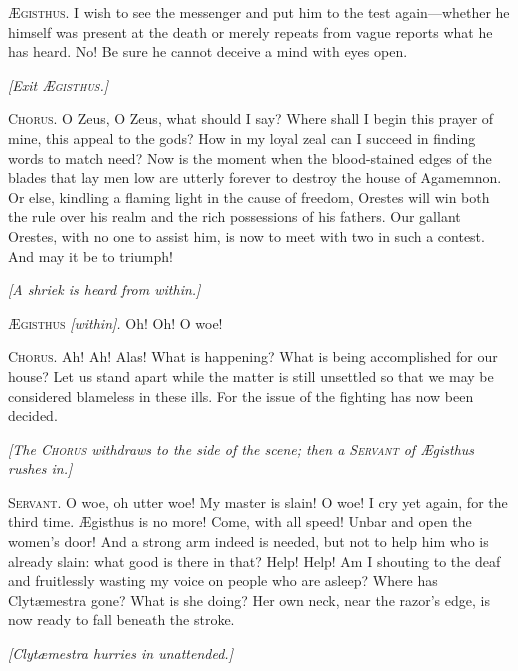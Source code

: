\documentclass[12pt]{article}
\begin{document}
\textsc{{\AE}gisthus.} I wish to see the messenger and put him to the test again---whether he himself was present at the death or merely repeats from vague reports what he has heard. No! Be sure he cannot deceive a mind with eyes open.

\begin{center}
\textit{[Exit \textsc{{\AE}gisthus}.]}
\end{center}

\textsc{Chorus.} O Zeus, O Zeus, what should I say? Where shall I begin this prayer of mine, this appeal to the gods? How in my loyal zeal can I succeed in finding words to match need? Now is the moment when the blood-stained edges of the blades that lay men low are utterly forever to destroy the house of Agamemnon. Or else, kindling a flaming light in the cause of freedom, Orestes will win both the rule over his realm and the rich possessions of his fathers. Our gallant Orestes, with no one to assist him, is now to meet with two in such a contest. And may it be to triumph!

\begin{center}
\textit{[A shriek is heard from within.]}
\end{center}

\textsc{{\AE}gisthus} \textit{[within].} Oh! Oh! O woe! 

\textsc{Chorus.} Ah! Ah! Alas! What is happening? What is being accomplished for our house? Let us stand apart while the matter is still unsettled so that we may be considered blameless in these ills. For the issue of the fighting has now been decided.

\begin{center}
\textit{[The \textsc{Chorus} withdraws to the side of the scene; then a \textsc{Servant} of {\AE}gisthus rushes in.]}
\end{center}

\textsc{Servant.} O woe, oh utter woe! My master is slain! O woe! I cry yet again, for the third time. {\AE}gisthus is no more! Come, with all speed! Unbar and open the women's door! And a strong arm indeed is needed, but not to help him who is already slain: what good is there in that? Help! Help! Am I shouting to the deaf and fruitlessly wasting my voice on people who are asleep? Where has Clyt{\ae}mestra gone? What is she doing? Her own neck, near the razor's edge, is now ready to fall beneath the stroke.

\begin{center}
\textit{[Clyt{\ae}mestra hurries in unattended.]}
\end{center}
\end{document}
